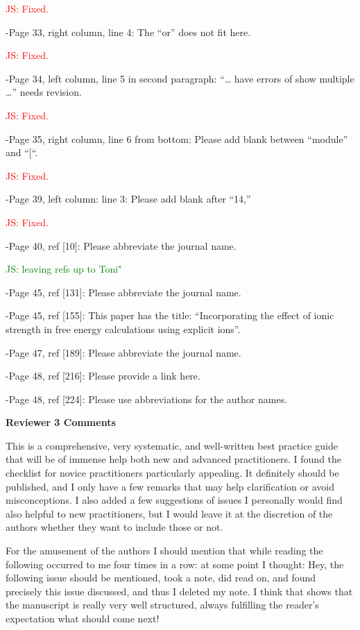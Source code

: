 \documentclass[10pt,stdletter]{newlfm}
\begin{document}
\begin{newlfm}
\textcolor{red}{JS: Fixed.}

-Page 33, right column, line 4: The “or” does not fit here.

\textcolor{red}{JS: Fixed.}

-Page 34, left column, line 5 in second paragraph: “… have errors of show multiple …” needs revision.

\textcolor{red}{JS: Fixed.}

-Page 35, right column, line 6 from bottom: Please add blank between “module” and “[“.

\textcolor{red}{JS: Fixed.}

-Page 39, left column: line 3: Please add blank after “14,”

\textcolor{red}{JS: Fixed.}

-Page 40, ref [10]: Please abbreviate the journal name.


\textcolor{green}{JS: leaving refs up to Toni"}

-Page 45, ref [131]: Please abbreviate the journal name.

-Page 45, ref [155]: This paper has the title: “Incorporating the effect of ionic strength in free energy calculations using explicit ions”.

-Page 47, ref [189]: Please abbreviate the journal name.

-Page 48, ref [216]: Please provide a link here.

-Page 48, ref [224]: Please use abbreviations for the author names.

\textbf{Reviewer 3 Comments}

This is a comprehensive, very systematic, and well-written best practice guide that will be of immense help both new and advanced practitioners. I found the checklist for novice practitioners particularly appealing. It definitely should be published, and I only have a few remarks that may help clarification or avoid misconceptions. I also added a few suggestions of issues I personally would find also helpful to new practitioners, but I would leave it at the discretion of the authors whether they want to include those or not.

For the amusement of the authors I should mention that while reading the following occurred to me four times in a row: at some point I thought: Hey, the following issue should be mentioned, took a note, did read on, and found precisely this issue discussed, and thus I deleted my note. I think that shows that the manuscript is really very well structured, always fulfilling the reader’s expectation what should come next!


\end{newlfm}
\end{document}
